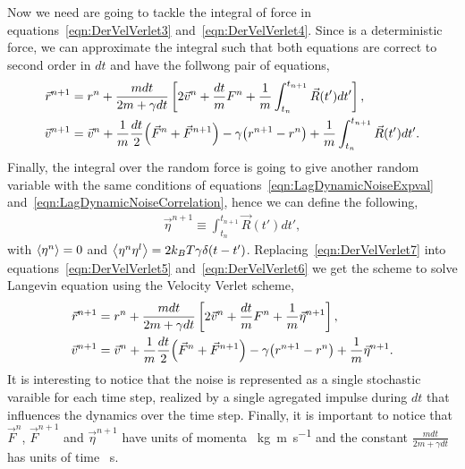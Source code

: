 Now we need are going to tackle the integral of force in equations~\eqref{eqn:DerVelVerlet3} and~\eqref{eqn:DerVelVerlet4}.
Since is a deterministic force, we can approximate the integral such that both equations are correct to second order in $dt$ and have the follwong pair of equations,
\begin{align}
    \vec{r}^{n+1} &= r^n
                    +\frac{m dt}{2m +\gamma dt}\left[ 
                        2\vec{v}^{n}                
                        +\frac{dt}{m}F^{n}
                        +\frac{1}{m}\int_{t_n}^{t_{n+1}}\vec{R}(t')dt'
                    \right]\label{eqn:DerVelVerlet5}
                    , \\
    \vec{v}^{n+1} &= \vec{v}^{n}
                     +\frac{1}{m}\frac{dt}{2}\qty(\vec{F}^{n} + \vec{F}^{n+1})
                     -\gamma\qty(r^{n+1}-r^n)
                     +\frac{1}{m}\int_{t_n}^{t_{n+1}}\vec{R}(t')dt'\label{eqn:DerVelVerlet6}.
\end{align}
Finally, the integral over the random force is going to give another random variable with the same conditions of equations~\eqref{eqn:LagDynamicNoiseExpval} and~\eqref{eqn:LagDynamicNoiseCorrelation}, hence we can define the following,
\begin{gather}
    \vec{\eta}^{n+1}\equiv\int_{t_n}^{t_{n+1}}\vec{R}(t')dt'\label{eqn:DerVelVerlet7},
\end{gather}
with $\expval{\eta^{n}}=0$ and $\expval{\eta^{n}\eta^{l}}=2k_{B}T\gamma\delta\qty(t-t')$.
Replacing~\eqref{eqn:DerVelVerlet7} into equations~\eqref{eqn:DerVelVerlet5} and~\eqref{eqn:DerVelVerlet6} we get the scheme to solve Langevin equation using the Velocity Verlet scheme,
\begin{align}
    \vec{r}^{n+1} &= r^n
                    +\frac{m dt}{2m +\gamma dt}\left[ 
                        2\vec{v}^{n}                
                        +\frac{dt}{m}F^{n}
                        +\frac{1}{m}\vec{\eta}^{n+1}
                    \right]\label{eqn:DerVelVerlet5}
                    , \\
    \vec{v}^{n+1} &= \vec{v}^{n}
                     +\frac{1}{m}\frac{dt}{2}\qty(\vec{F}^{n} + \vec{F}^{n+1})
                     -\gamma\qty(r^{n+1}-r^n)
                     +\frac{1}{m}\vec{\eta}^{n+1}\label{eqn:DerVelVerlet6}.
\end{align}
It is interesting to notice that the noise is represented as a single stochastic varaible for each time step, realized by a single agregated impulse during $dt$ that influences the dynamics over the time step.
Finally, it is important to notice that $\vec{F}^{n}$, $\vec{F}^{n+1}$ and $\vec{\eta}^{n+1}$ have units of momenta \SI{}{\kilo\gram\meter\per\second} and the constant $\frac{m dt}{2m +\gamma dt}$ has units of time \SI{}{\second}. 

